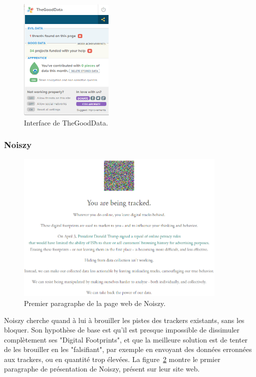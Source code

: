 			\begin{figure}[h]
				\centering
				\includegraphics[width=0.4\textwidth]{images/analysis/thegooddata}
				\caption{Interface de TheGoodData\cite{thegooddata}.}
				\label{a-thegooddata}
			\end{figure}

		\subsubsection{Noiszy}

			\begin{figure}[h]
				\centering
				\includegraphics[width=0.9\textwidth]{images/analysis/noiszy}
				\caption{Premier paragraphe de la page web de Noiszy\cite{noiszy}.}
				\label{a-noiszy}
			\end{figure}

			Noiszy cherche quand à lui à brouiller les pistes des trackers existants, sans les bloquer. Son hypothèse de base est qu'il est presque impossible de dissimuler complètement ses "Digital Footprints", et que la meilleure solution est de tenter de les brouiller en les "falsifiant", par exemple en envoyant des données erronnées aux trackers, ou en quantité trop élevées.
			La figure~\ref{a-noiszy} montre le prmier paragraphe de présentation de Noiszy, présent sur leur site web.

